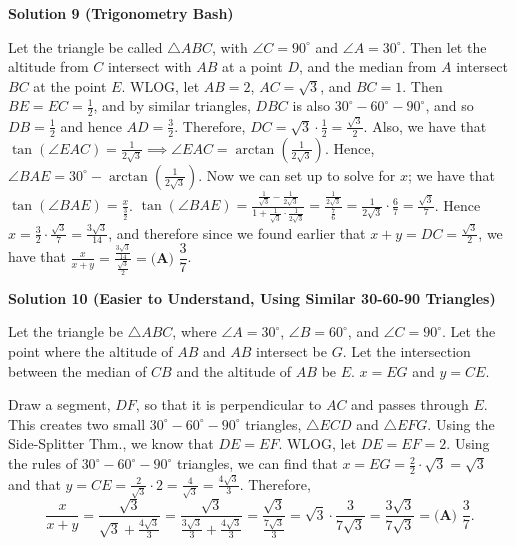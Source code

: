 \begin{enumerate}
 



\textbf{Solution 9 (Trigonometry Bash)}

Let the triangle be called $\triangle ABC$, with $\angle C=90^{\circ}$ and $\angle A=30^{\circ}$. Then let the altitude from $C$ intersect with $AB$ at a point $D$, and the median from $A$ intersect $BC$ at the point $E$. WLOG, let $AB=2$, $AC=\sqrt{3}$, and $BC=1$. Then $BE=EC=\frac12$, and by similar triangles, $DBC$ is also $30^{\circ}{-}60^{\circ}{-}90^{\circ}$, and so $DB=\frac12$ and hence $AD=\frac32$. Therefore, $DC=\sqrt{3}\cdot\frac12=\frac{\sqrt{3}}2$. Also, we have that $\tan(\angle EAC)=\frac1{2\sqrt{3}}\implies\angle EAC=\arctan\left(\frac1{2\sqrt{3}}\right)$. Hence, $\angle BAE=30^{\circ}-\arctan\left(\frac1{2\sqrt{3}}\right)$. Now we can set up to solve for $x$; we have that $\tan(\angle BAE)=\frac{x}{\frac32}$. $\tan(\angle BAE)=\frac{\frac1{\sqrt{3}}-\frac1{2\sqrt{3}}}{1+\frac1{\sqrt{3}}\cdot\frac1{2\sqrt{3}}}=\frac{\frac1{2\sqrt{3}}}{\frac76}=\frac1{2\sqrt{3}}\cdot\frac67=\frac{\sqrt{3}}7$. Hence $x=\frac32\cdot\frac{\sqrt{3}}7=\frac{3\sqrt{3}}{14}$, and therefore since we found earlier that $x+y=DC=\frac{\sqrt{3}}2$, we have that $\frac{x}{x+y}=\frac{\frac{3\sqrt{3}}{14}}{\frac{\sqrt{3}}2}=\boxed{\textbf{(A) } \dfrac{3}{7}}$.

 



\textbf{Solution 10 (Easier to Understand, Using Similar 30-60-90 Triangles)}

Let the triangle be $\triangle ABC$, where $\angle A=30^\circ$, $\angle B=60^\circ$, and $\angle C=90^\circ$. Let the point where the altitude of $AB$ and $AB$ intersect be $G$. Let the intersection between the median of $CB$ and the altitude of $AB$ be $E$. $x=EG$ and $y=CE$.

 Draw a segment, $DF$, so that it is perpendicular to $AC$ and passes through $E$. This creates two small $30^\circ{-}60^\circ{-}90^\circ$ triangles, $\triangle ECD$ and $\triangle EFG$. Using the Side-Splitter Thm., we know that $DE=EF$. WLOG, let $DE=EF=2$. Using the rules of $30^\circ{-}60^\circ{-}90^\circ$ triangles, we can find that $x=EG=\frac{2}{2}\cdot\sqrt{3}=\sqrt{3}$ and that $y=CE=\frac{2}{\sqrt{3}}\cdot2=\frac{4}{\sqrt{3}}=\frac{4\sqrt{3}}{3}$. Therefore, 
 \[\frac{x}{x+y}=\frac{\sqrt{3}}{\sqrt{3}+\frac{4\sqrt{3}}{3}}=\frac{\sqrt{3}}{\frac{3\sqrt{3}}{3}+\frac{4\sqrt{3}}{3}}=\frac{\sqrt{3}}{\frac{7\sqrt{3}}{3}}=\sqrt{3}\cdot\frac{3}{7\sqrt{3}}=\frac{3\sqrt{3}}{7\sqrt{3}}=\boxed{\textbf{(A) } \dfrac{3}{7}}.\]





\end{enumerate}

